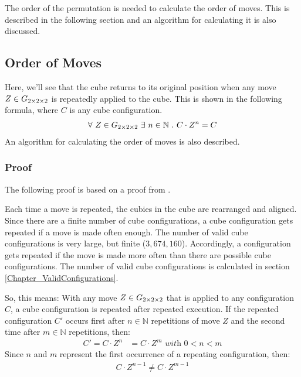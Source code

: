 The order of the permutation is needed to calculate the order of moves. This is described in the following section and an algorithm for calculating it is also discussed.
\subsection{Order of Moves}
\label{Section_Ordermoves}
Here, we'll see that the cube returns to its original position when any move $Z \in G_{2\times 2\times 2}$ is repeatedly applied to the cube. This is shown in the following formula, where $C$ is any cube configuration.
\begin{align*}
\forall \ Z \in G_{2\times 2\times 2} \ \exists \ n \in \mathbb{N} \ . \ C \cdot Z^n = C
\end{align*} \nopagebreak An algorithm for calculating the order of moves is also described.
\subsubsection*{Proof}

The following proof is based on a proof from \cite{TD}.

Each time a move is repeated, the cubies in the cube are rearranged and aligned.\\
Since there are a finite number of cube configurations, a cube configuration gets repeated if a move is made often enough.
The number of valid cube configurations is very large, but finite ($3 , 674 , 160$). Accordingly, a configuration gets repeated if the move is made more often than there are possible cube configurations. The number of valid cube configurations is calculated in section \ref{Chapter_ValidConfigurations}.

So, this means: With any move $Z \in G_{2\times 2\times 2}$ that is applied to any configuration $C$, a cube configuration is repeated after repeated execution. If the repeated configuration $C'$ occurs first after $n \in \mathbb{N}$ repetitions of move $Z$ and the second time after $m \in \mathbb{N}$ repetitions, then:
\begin{align*}
C' = C \cdot Z^n& = C \cdot Z^m \textit{ with } 0<n<m
\end{align*}
Since $n$ and $m$ represent the first occurrence of a repeating configuration, then:
\begin{align*}
C \cdot Z^{n-1} \neq C \cdot Z^{m-1}
\end{align*}

